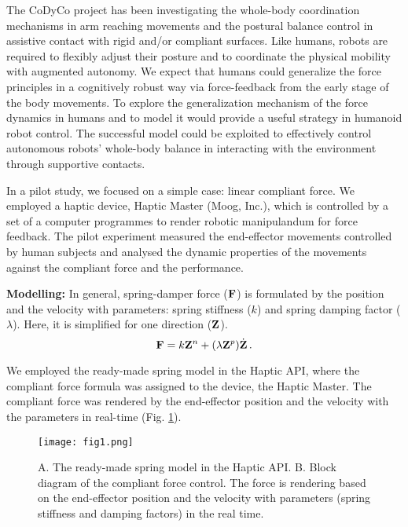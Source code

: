 The CoDyCo project has been investigating the whole-body coordination
mechanisms in arm reaching movements and the postural balance control in
assistive contact with rigid and/or compliant surfaces. Like humans, robots
are required to flexibly adjust their posture and to coordinate the physical
mobility with augmented autonomy. We expect that humans could generalize the
force principles in a cognitively robust way via force-feedback from the early
stage of the body movements. To explore the generalization mechanism of the
force dynamics in humans and to model it would provide a useful strategy in
humanoid robot control. The successful model could be exploited to effectively
control autonomous robots' whole-body balance in interacting with the
environment through supportive contacts.

In a pilot study, we focused on a simple case: linear compliant force. 
We employed a haptic device, Haptic Master (Moog, Inc.), which is controlled by 
a set of a computer programmes to render robotic manipulandum for force 
feedback. The pilot experiment measured the end-effector movements controlled 
by human subjects and analysed the dynamic properties of the movements against 
the compliant force and the performance.




\textbf{Modelling:} In general, spring-damper force ($\mathbf{F}$) is formulated by the position and the
velocity with parameters: spring stiffness ($k$) and spring damping factor
($\lambda$).  Here, it is simplified for one direction ($\mathbf{Z}$).
%
\begin{equation}
\mathbf{F} = k \mathbf{Z}^n + (\lambda \mathbf{Z}^p) \dot{\mathbf{Z}} \, .
\end{equation}
%

We employed the ready-made spring model in the Haptic API, where the 
compliant force formula was assigned to the device, the Haptic Master. 
The compliant force was rendered by the end-effector position and the 
velocity with the parameters in real-time (Fig. \ref{modelling}). 
%
\begin{figure}
	\centering
	\texttt{[image: fig1.png]}
	\caption{A. The ready-made spring model in the Haptic API. B. Block 
		diagram of the compliant force control. The force is rendering
		based on the end-effector position and the velocity with parameters 
		(spring stiffness and damping factors) in the real time.}
	\label{modelling}
\end{figure}


